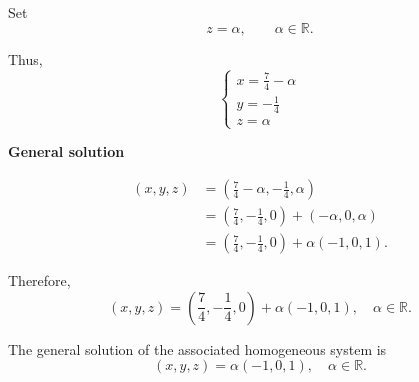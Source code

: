 \begin{enumerate}[label=\alph*)]
\begin{answer}
    Set
    $$
    z=\alpha,\qquad\alpha\in\mathbb R.
    $$

    Thus,
    $$
    \begin{cases}
    x=\frac74-\alpha\\
    y=-\frac14\\
    z=\alpha
    \end{cases}
    $$

    \textbf{General solution}

    $$
    \begin{aligned}
    (x,y,z)
    &=\left(\frac74-\alpha,
                -\frac14,\alpha\right)\\
    &=\left(\frac74,-\frac14,0\right)
        +(-\alpha,0,\alpha)\\
    &=\left(\frac74,-\frac14,0\right)
        +\alpha(-1,0,1).
    \end{aligned}
    $$

    Therefore,
    $$
    \boxed{
    (x,y,z)=
    \left(\frac74,-\frac14,0\right)
    +\alpha(-1,0,1),
    \quad\alpha\in\mathbb R.
    }
    $$

    The general solution of the associated homogeneous system is
    $$
    \boxed{
    (x,y,z)=\alpha(-1,0,1),
    \quad\alpha\in\mathbb R.
    }
    $$
\end{answer}

\end{enumerate}
